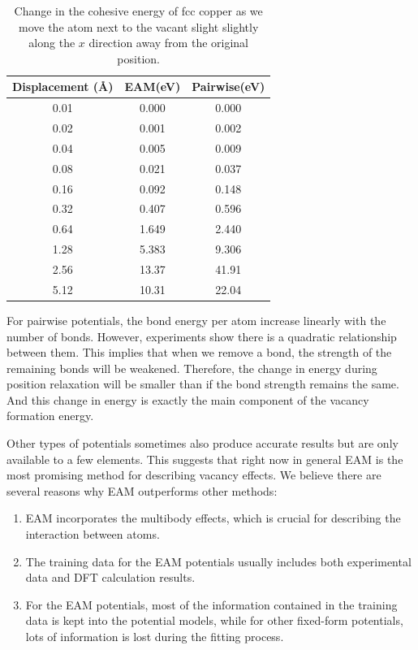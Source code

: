 \documentclass[%
 reprint,
 amsmath,amssymb,
 aps,
]{revtex4-1}
\begin{document}
\begin{table}
\caption{\label{tab:cu}
 Change in the cohesive energy of fcc copper as we move the atom next to the vacant slight slightly along the $x$ direction away from the original position.
}
\begin{ruledtabular}
\begin{tabular}{c c c}
 Displacement (\AA) & EAM\footnotemark[1] (eV) & Pairwise\footnotemark[2] (eV)\\
\hline
0.01 & 0.000 & 0.000 \\
0.02 & 0.001 & 0.002 \\
0.04 & 0.005 & 0.009 \\
0.08 & 0.021 & 0.037 \\
0.16 & 0.092 & 0.148 \\
0.32 & 0.407 & 0.596 \\
0.64 & 1.649 & 2.440 \\
1.28 & 5.383 & 9.306 \\
2.56 & 13.37 & 41.91 \\
5.12 & 10.31 & 22.04 \\
\end{tabular}
\end{ruledtabular}
\end{table}

For pairwise potentials, the bond energy per atom increase linearly with the number of bonds.
However, experiments show there is a quadratic relationship between them.
This implies that when we remove a bond, the strength of the remaining bonds will be weakened.
Therefore, the change in energy during position relaxation will be smaller than if the bond strength remains the same.
And this change in energy is exactly the main component of the vacancy formation energy.

Other types of potentials sometimes also produce accurate results but are only available to a few elements.
This suggests that right now in general EAM is the most promising method for describing vacancy effects.
We believe there are several reasons why EAM outperforms other methods:
\begin{enumerate}
\item EAM incorporates the multibody effects, which is crucial for describing the interaction between atoms.
\item The training data for the EAM potentials usually includes both experimental data and DFT calculation results.
\item For the EAM potentials, most of the information contained in the training data is kept into the potential models, while for other fixed-form potentials, lots of information is lost during the fitting process.
\end{enumerate}
\end{document}
